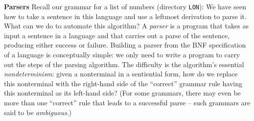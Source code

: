\begin{minipage}[t]{\sw}
\slidenumber
\LARGE
{\bf Parsers}\exx
Recall our grammar for a list of numbers
(directory {\color{red}\verb'LON'}):\exx
\emm{\Large\LightBox{\MYlon}}\exx
We have seen how to take a sentence in this language
and use a leftmost derivation to parse it.
What can we do to automate this algorithm?\exx
A {\em parser} is a program
that takes as input a sentence in a language
and that carries out a parse of the sentence,
producing either success or failure.
Building a parser from the BNF specification of a language
is conceptually simple:
we only need to write a program
to carry out the steps of the parsing algorithm.
The difficulty is the algorithm's essential {\em nondeterminism}:
given a nonterminal in a sentiential form,
how do we replace this nonterminal with the right-hand side
of the ``correct'' grammar rule
having this nonterminal as its left-hand side?
(For some grammars, there may even be more than one ``correct'' rule
that leads to a successful parse --
such grammars are said to be {\em ambiguous}.)\exx
\end{minipage}
\clearpage
